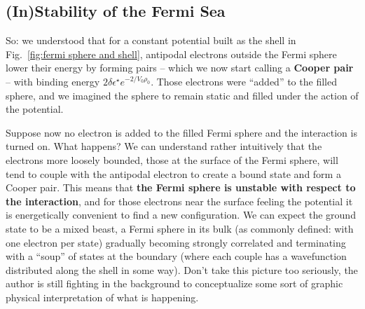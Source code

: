 \subsection{(In)Stability of the Fermi Sea}

So: we understood that for a constant potential built as the shell in Fig.~\ref{fig:fermi sphere and shell}, antipodal electrons outside the Fermi sphere lower their energy by forming pairs -- which we now start calling a \textbf{Cooper pair} -- with binding energy $2\delta\epsilon^\star e^{-2/V_0 \rho_0}$. Those electrons were ``added'' to the filled sphere, and we imagined the sphere to remain static and filled under the action of the potential.

Suppose now no electron is added to the filled Fermi sphere and the interaction is turned on. What happens? We can understand rather intuitively that the electrons more loosely bounded, those at the surface of the Fermi sphere, will tend to couple with the antipodal electron to create a bound state and form a Cooper pair. This means that \textbf{the Fermi sphere is unstable with respect to the interaction}, and for those electrons near the surface feeling the potential it is energetically convenient to find a new configuration. We can expect the ground state to be a mixed beast, a Fermi sphere in its bulk (as commonly defined: with one electron per state) gradually becoming strongly correlated and terminating with a ``soup'' of states at the boundary (where each couple has a wavefunction distributed along the shell in some way). Don't take this picture too seriously, the author is still fighting in the background to conceptualize some sort of graphic physical interpretation of what is happening.

